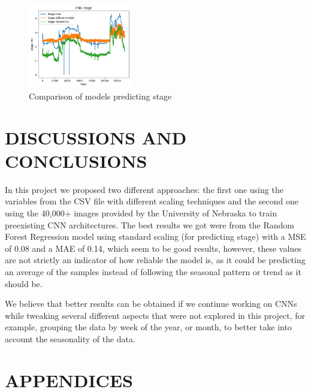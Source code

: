\documentclass[conference]{IEEEtran}
\begin{document}
\begin{figure}[h]
\centering
\includegraphics[width=0.4\textwidth]{CNN-Stage.png}
\caption{Comparison of models predicting stage}
\end{figure}

\section{DISCUSSIONS AND CONCLUSIONS}
In this project we proposed two different approaches: the first one using the variables from the CSV file with different scaling techniques and the second one using the 40,000+ images provided by the University of Nebraska to train preexisting CNN architectures.
The best results we got were from the Random Forest Regression model using standard scaling (for predicting stage) with a MSE of 0.08 and a MAE of 0.14, which seem to be good results, however, these values are not strictly an indicator of how reliable the model is, as it could be predicting an average of the samples instead of following the seasonal pattern or trend as it should be.

We believe that better results can be obtained if we continue working on CNNs while tweaking several different aspects that were not explored in this project, for example, grouping the data by week of the year, or month, to better take into account the seasonality of the data.

\newpage
\section{APPENDICES}
\end{document}
